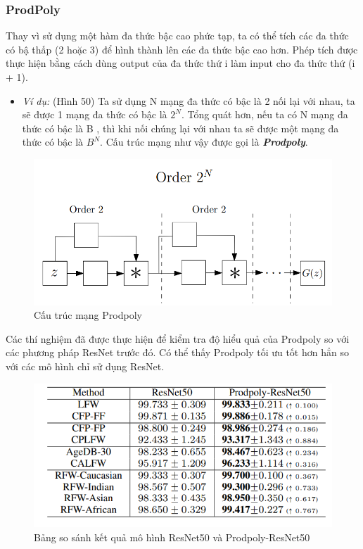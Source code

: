 \documentclass[a4paper, 12pt]{article}
\begin{document}
\subsubsection{ProdPoly}
Thay vì sử dụng một hàm đa thức bậc cao phức tạp, ta có thể tích các đa thức có bậ thấp (2 hoặc 3) để hình thành lên các đa thức bậc cao hơn. Phép tích được thực hiện bằng cách dùng output của đa thức thứ i làm input cho đa thức thứ (i + 1).
\begin{itemize}
    \item \textit{Ví dụ:} (Hình 50) Ta sử dụng N mạng đa thức có bậc là 2 nối lại với nhau, ta sẽ được 1 mạng đa thức có bậc là $2^N$. Tổng quát hơn, nếu ta có N mạng đa thức có bậc là B , thì khi nối chúng lại với nhau ta sẽ được một mạng đa thức có bậc là $B^N$. Cấu trúc mạng như vậy được gọi là \textbf{\textit{Prodpoly}}.
\end{itemize}
\begin{figure}[H]
    \begin{center}
        \includegraphics[scale=0.4]{img/prodpoly}
        \caption{Cấu trúc mạng Prodpoly}
    \end{center}
\end{figure}

Các thí nghiệm đã được thực hiện để kiểm tra độ hiểu quả của Prodpoly so với các phương pháp ResNet trước đó. Có thể thấy Prodpoly tối ưu tốt hơn hẳn so với các mô hình chỉ sử dụng ResNet.

\begin{figure}[H]
    \begin{center}
        \includegraphics[scale=0.4]{img/resnet-vs-pnet}
        \caption{Bảng so sánh kết quả mô hình ResNet50 và Prodpoly-ResNet50}
    \end{center}
\end{figure}
\clearpage
\end{document}
